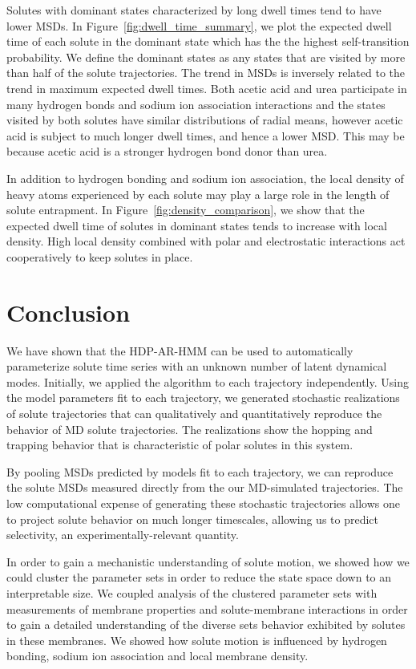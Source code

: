 \documentclass[journal=jpcbfk,manuscript=article]{achemso}
\begin{document}
  Solutes with dominant states characterized by long dwell times tend to 
  have lower MSDs. In Figure~\ref{fig:dwell_time_summary}, we plot the expected dwell
  time of each solute in the dominant state which has the the highest 
  self-transition probability. We define the dominant states as any states that
  are visited by more than half of the solute trajectories. The trend in MSDs is
  inversely related to the trend in maximum expected dwell times. Both acetic acid
  and urea participate in many hydrogen bonds and sodium ion association interactions
  and the states visited by both solutes have similar distributions of radial means,
  however acetic acid is subject to much longer dwell times, and hence a lower MSD. 
  This may be because acetic acid is a stronger hydrogen bond donor than urea.
  
  In addition to hydrogen bonding and sodium ion association, the local density 
  of heavy atoms experienced by each solute may play a large role in the length
  of solute entrapment. In Figure~\ref{fig:density_comparison}, we show that the
  expected dwell time of solutes in dominant states tends to increase with 
  local density. High local density combined with polar and electrostatic interactions
  act cooperatively to keep solutes in place.
  
  \section{Conclusion}
  
  We have shown that the HDP-AR-HMM can be used to automatically parameterize solute 
  time series with an unknown number of latent dynamical modes. Initially, we applied
  the algorithm to each trajectory independently. Using the model parameters fit
  to each trajectory, we generated stochastic realizations of solute trajectories that
  can qualitatively and quantitatively reproduce the behavior of MD solute 
  trajectories. The realizations show the hopping and trapping behavior that is
  characteristic of polar solutes in this system. 
  
  By pooling MSDs predicted by models fit to each trajectory, we can reproduce
  the solute MSDs measured directly from the our MD-simulated trajectories. 
  The low computational expense of generating these stochastic trajectories allows
  one to project solute behavior on much longer timescales, allowing us to predict
  selectivity, an experimentally-relevant quantity.
  
  In order to gain a mechanistic understanding of solute motion, we showed how 
  we could cluster the parameter sets in order to reduce the state space down
  to an interpretable size. We coupled analysis of the clustered parameter sets
  with measurements of membrane properties and solute-membrane interactions 
  in order to gain a detailed understanding of the diverse sets behavior 
  exhibited by solutes in these membranes. We showed how
  solute motion is influenced by hydrogen bonding, sodium ion association and local
  membrane density.
  
\end{document}

